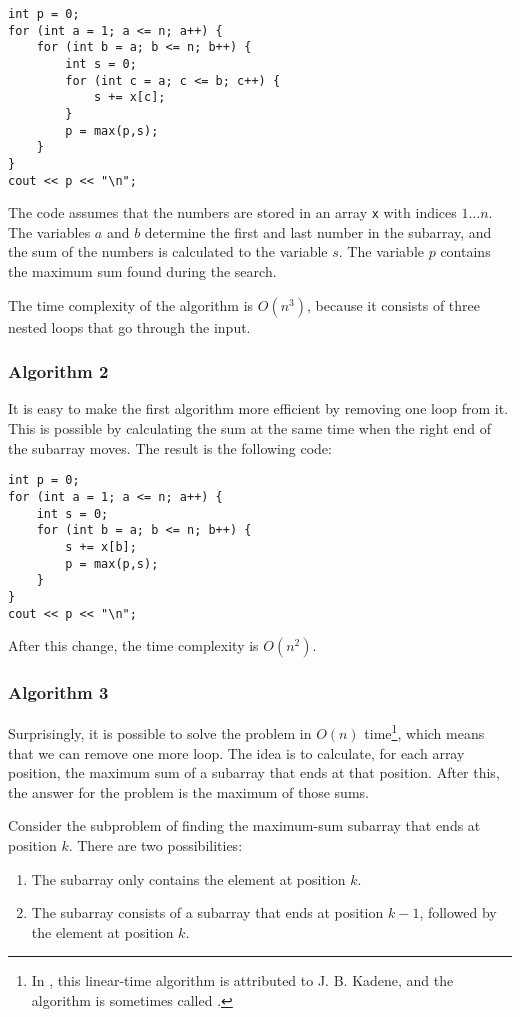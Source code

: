 \begin{lstlisting}
int p = 0;
for (int a = 1; a <= n; a++) {
    for (int b = a; b <= n; b++) {
        int s = 0;
        for (int c = a; c <= b; c++) {
            s += x[c];
        }
        p = max(p,s);
    }
}
cout << p << "\n";
\end{lstlisting}

The code assumes that the numbers are stored in an array \texttt{x}
with indices $1 \ldots n$.
The variables $a$ and $b$ determine the first and last
number in the subarray,
and the sum of the numbers is calculated to the variable $s$.
The variable $p$ contains the maximum sum found during the search.

The time complexity of the algorithm is $O(n^3)$,
because it consists of three nested loops 
that go through the input.

\subsubsection{Algorithm 2}

It is easy to make the first algorithm more efficient
by removing one loop from it.
This is possible by calculating the sum at the same
time when the right end of the subarray moves.
The result is the following code:

\begin{lstlisting}
int p = 0;
for (int a = 1; a <= n; a++) {
    int s = 0;
    for (int b = a; b <= n; b++) {
        s += x[b];
        p = max(p,s);
    }
}
cout << p << "\n";
\end{lstlisting}
After this change, the time complexity is $O(n^2)$.

\subsubsection{Algorithm 3}

Surprisingly, it is possible to solve the problem
in $O(n)$ time\footnote{In \cite{ben86}, this linear-time algorithm
is attributed to J. B. Kadene, and the algorithm is sometimes
called  .}, which means that we can remove
one more loop.
The idea is to calculate, for each array position,
the maximum sum of a subarray that ends at that position.
After this, the answer for the problem is the
maximum of those sums.

Consider the subproblem of finding the maximum-sum subarray
that ends at position $k$.
There are two possibilities:
\begin{enumerate}
\item The subarray only contains the element at position $k$.
\item The subarray consists of a subarray that ends
at position $k-1$, followed by the element at position $k$.
\end{enumerate}

